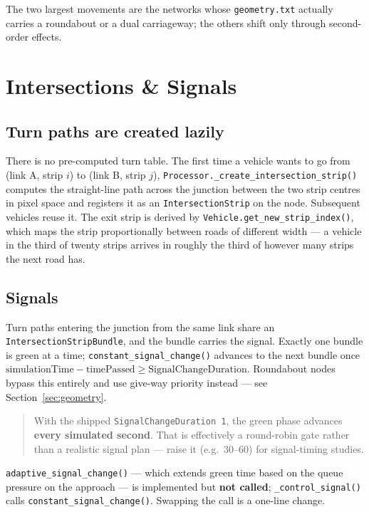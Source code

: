 \documentclass[11pt, a4paper]{article}
\newcommand{\code}[1]{\texttt{#1}}
\begin{document}
The two largest movements are the networks whose \code{geometry.txt} actually
carries a roundabout or a dual carriageway; the others shift only through
second-order effects.

\section{Intersections \& Signals}
\label{sec:signals}

\subsection{Turn paths are created lazily}

There is no pre-computed turn table. The first time a vehicle wants to go from
(link A, strip $i$) to (link B, strip $j$),
\code{Processor.\_create\_intersection\_strip()} computes the straight-line path
across the junction between the two strip centres in pixel space and registers it
as an \code{IntersectionStrip} on the node. Subsequent vehicles reuse it. The
exit strip is derived by \code{Vehicle.get\_new\_strip\_index()}, which maps the
strip proportionally between roads of different width --- a vehicle in the third
of twenty strips arrives in roughly the third of however many strips the next
road has.

\subsection{Signals}

Turn paths entering the junction from the same link share an
\code{IntersectionStripBundle}, and the bundle carries the signal. Exactly one
bundle is green at a time; \code{constant\_signal\_change()} advances to the next
bundle once
$\text{simulationTime} - \text{timePassed} \geq \text{SignalChangeDuration}$.
Roundabout nodes bypass this entirely and use give-way priority instead ---
see Section~\ref{sec:geometry}.

\begin{quote}
With the shipped \code{SignalChangeDuration 1}, the green phase advances
\textbf{every simulated second}. That is effectively a round-robin gate rather
than a realistic signal plan --- raise it (e.g.\ 30--60) for signal-timing
studies.
\end{quote}

\code{adaptive\_signal\_change()} --- which extends green time based on the queue
pressure on the approach --- is implemented but \textbf{not called};
\code{\_control\_signal()} calls \code{constant\_signal\_change()}. Swapping the
call is a one-line change.
\end{document}
